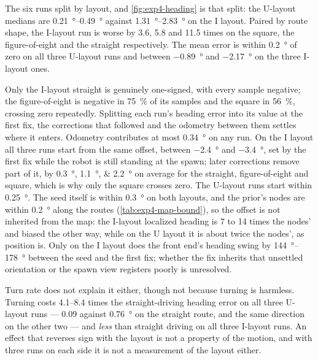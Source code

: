 \documentclass[11pt,a4paper,notitlepage]{report}
\begin{document}
The six runs split by layout, and \cref{fig:exp4-heading} is that split: the
U-layout medians are \SIrange{0.21}{0.49}{\degree} against
\SIrange{1.31}{2.83}{\degree} on the I layout. Paired by route shape, the
I-layout run is worse by \num{3.6}, \num{5.8} and \num{11.5} times on the
square, the figure-of-eight and the straight respectively.
The mean error is within \SI{0.2}{\degree} of zero on all three U-layout runs
and between \SI{-0.89}{\degree} and \SI{-2.17}{\degree} on the three I-layout ones.

 Only the
I-layout straight is genuinely one-signed, with every sample negative; the
figure-of-eight is negative in \SI{75}{\percent} of its samples and the square
in \SI{56}{\percent}, crossing zero repeatedly. Splitting each run's heading
error into its value at the first fix, the corrections that followed and the
odometry between them settles where it enters. Odometry contributes at most
\SI{0.34}{\degree} on any run. On the I layout all three runs start from the
same offset, between \SI{-2.4}{\degree} and \SI{-3.4}{\degree}, set by the first fix while the
robot is still standing at the spawn; later corrections remove part of it, by
\SIlist[retain-explicit-plus]{+0.3;+1.1;+2.2}{\degree} on average for the
straight, figure-of-eight and square, which is why only the square crosses
zero. The U-layout runs start within \SI{0.25}{\degree}. The seed itself is
within \SI{0.3}{\degree} on both layouts, and the prior's nodes are within
\SI{0.2}{\degree} along the routes (\cref{tab:exp4-map-bound}), so the offset
is not inherited from the map: the I-layout localized heading is 7 to 14 times
the nodes' and biased the other way, while on the U layout it is about twice
the nodes', as position is. Only on the I layout does the front end's heading
swing by \SIrange{144}{178}{\degree} between the seed and the first fix;
whether the fix inherits that unsettled orientation or the spawn view
registers poorly is unresolved.

Turn rate does not explain it either, though not because turning is harmless.
Turning costs \numrange{4.1}{8.4} times the straight-driving heading error on
all three U-layout runs --- \SI{0.09}{} against \SI{0.76}{\degree} on the
straight route, and the same direction on the other two --- and \emph{less}
than straight driving on all three I-layout runs. An effect that reverses sign
with the layout is not a property of the motion, and with three runs on each
side it is not a measurement of the layout either.
\end{document}
